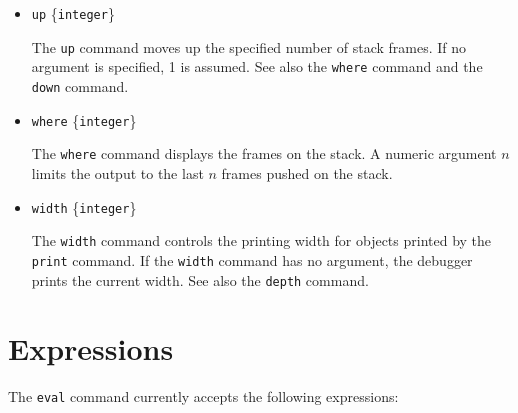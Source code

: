 \begin{itemize}
\item {\tt up} \{{\tt integer}\}
  
  The {\tt up} command moves up the specified number of stack
  frames.  If no argument is specified, 1 is assumed.  See also the
  {\tt where} command and the {\tt down} command.

\item {\tt where} \{{\tt integer}\}
  
  The {\tt where} command displays the frames on the stack.  A numeric
  argument $n$ limits the output to the last $n$ frames pushed on the
  stack.

\item {\tt width} \{{\tt integer}\}
  
  The {\tt width} command controls the printing width for objects
  printed by the {\tt print} command.  If the {\tt width} command has
  no argument, the debugger prints the current width.  See also the
  {\tt depth} command.

\end{itemize}

\section{Expressions}

The {\tt eval} command currently accepts the following expressions:

